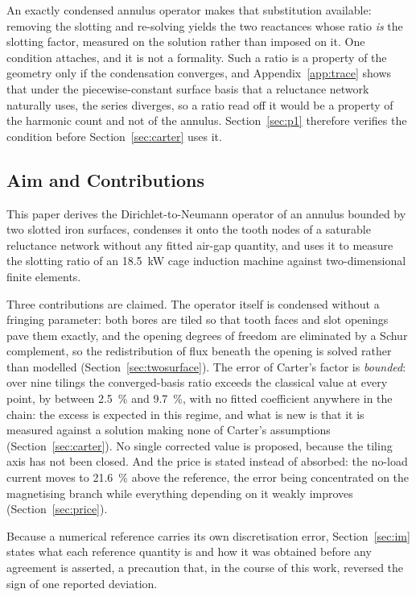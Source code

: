 \documentclass[10pt,a4paper,twocolumn]{article}
\theoremstyle{plain}
\theoremstyle{remark}
\begin{document}
An exactly condensed annulus operator makes that substitution available:
removing the slotting and re-solving yields the two reactances whose
ratio \emph{is} the slotting factor, measured on the solution rather
than imposed on it. One condition attaches, and it is not a formality.
Such a ratio is a property of the geometry only if the condensation
converges, and Appendix~\ref{app:trace} shows that under the
piecewise-constant surface basis that a reluctance network naturally
uses, the series diverges, so a ratio read off it would be a property
of the harmonic count and not of the annulus. Section~\ref{sec:p1}
therefore verifies the condition before Section~\ref{sec:carter} uses
it.

\subsection{Aim and Contributions}

This paper derives the Dirichlet-to-Neumann operator of an annulus
bounded by two slotted iron surfaces, condenses it onto the tooth nodes
of a saturable reluctance network without any fitted air-gap quantity,
and uses it to measure the slotting ratio of an \SI{18.5}{\kilo\watt}
cage induction machine against two-dimensional finite elements.

Three contributions are claimed. The operator itself is condensed
without a fringing parameter: both bores are tiled so that tooth faces
and slot openings pave them exactly, and the opening degrees of freedom
are eliminated by a Schur complement, so the redistribution of flux
beneath the opening is solved rather than modelled
(Section~\ref{sec:twosurface}). The error of Carter's factor is
\emph{bounded}: over nine tilings the converged-basis ratio exceeds the
classical value at every point, by between \SI{2.5}{\percent} and
\SI{9.7}{\percent}, with no fitted coefficient anywhere in the
chain: the excess is expected in this regime, and what is new is that
it is measured against a solution making none of Carter's assumptions
(Section~\ref{sec:carter}). No single corrected value is proposed,
because the tiling axis has not been closed. And the price is stated
instead of absorbed: the no-load current moves to
\SI{+21.6}{\percent} above the reference, the error being concentrated
on the magnetising branch while everything depending on it weakly
improves (Section~\ref{sec:price}).

Because a numerical reference carries its own discretisation error,
Section~\ref{sec:im} states what each reference quantity is and how it
was obtained before any agreement is asserted, a precaution that, in
the course of this work, reversed the sign of one reported deviation.
\end{document}
